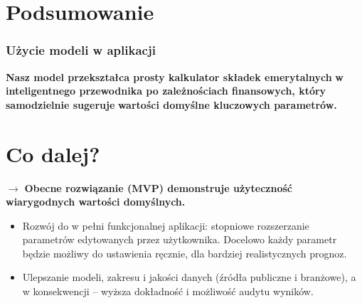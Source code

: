 \section{Podsumowanie}

\begin{frame}
  \frametitle{Użycie modeli w aplikacji}
  \textbf{Nasz model przekształca prosty kalkulator składek emerytalnych}
  \textbf{w inteligentnego przewodnika po zależnościach finansowych, który samodzielnie sugeruje}
  \textbf{wartości domyślne kluczowych parametrów.}
  \\
  \pause
\end{frame}

\section{Co dalej?}

\begin{frame}
  $\rightarrow$ \textbf{Obecne rozwiązanie (MVP) demonstruje użyteczność wiarygodnych wartości domyślnych.}
  \pause
  \begin{itemize}
    \item Rozwój do w pełni funkcjonalnej aplikacji: stopniowe rozszerzanie parametrów edytowanych przez użytkownika.
          Docelowo każdy parametr będzie możliwy do ustawienia ręcznie, dla bardziej realistycznych prognoz.
    \pause
    \item Ulepszanie modeli, zakresu i jakości danych (źródła publiczne i branżowe),
          a w konsekwencji – wyższa dokładność i możliwość audytu wyników.
  \end{itemize}
\end{frame}